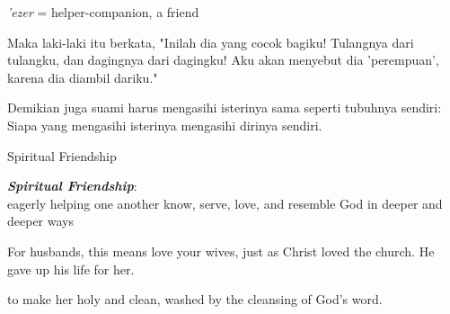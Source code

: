 \documentclass{beamer}
\begin{document}
\begin{frame}{}
	\LARGE
	\centering
	\textit{'ezer} = helper-companion, a friend
\end{frame}

\begin{frame}{}
	\Large
\begin{tcolorbox}[colback=green!5,colframe=green!40!black,title=Kejadian 2:23 (TSI)]
Maka laki-laki itu berkata, "Inilah dia yang cocok bagiku! Tulangnya dari tulangku, dan dagingnya dari dagingku! Aku akan menyebut dia 'perempuan', karena dia diambil dariku."
\end{tcolorbox}
\end{frame}

\begin{frame}{}
	\Large
	\begin{tcolorbox}[colback=green!5,colframe=green!40!black,title=Kejadian 5:28 (TB)]
		Demikian juga suami harus mengasihi isterinya sama seperti tubuhnya sendiri: Siapa yang mengasihi isterinya mengasihi dirinya sendiri.
	\end{tcolorbox}
\end{frame}



\begin{frame}{}
	\LARGE
	\centering
	Spiritual Friendship
\end{frame}

\begin{frame}{}
	\LARGE
	\centering
	\textit{\textbf{Spiritual Friendship}}:\\ 
	eagerly helping one another know, serve, love, and resemble God in deeper and deeper ways
\end{frame}

\begin{frame}{}
	\Large
	\begin{tcolorbox}[colback=green!5,colframe=green!40!black,title=Efesus 5:25 (NLT)]
		For husbands, this means love your wives, just as Christ loved the church. He gave up his life for her.
	\end{tcolorbox}
\end{frame}

\begin{frame}{}
	\Large
	\begin{tcolorbox}[colback=green!5,colframe=green!40!black,title=Efesus 5:26 (NLT)]
		to make her holy and clean, washed by the cleansing of God's word.
	\end{tcolorbox}
\end{frame}
\end{document}

